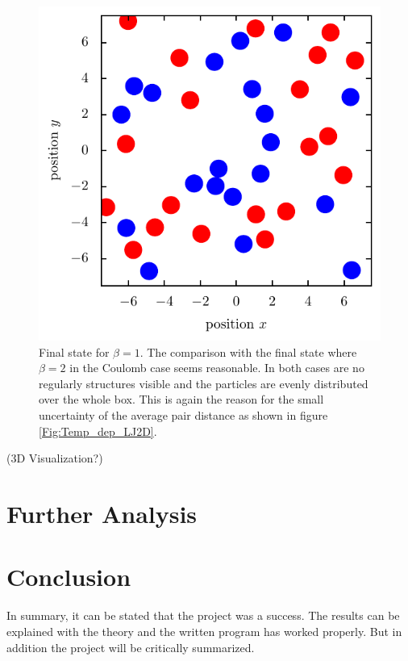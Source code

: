 \documentclass[11pt, a4paper]{article}
\numberwithin{equation}{section}
\newcommand{\remark}[1]{{\color{red}(#1)}}
\begin{document}
\begin{figure}[!h]
\centering
\includegraphics[scale=1]{figures/Beta_1_LJ.pdf}
\caption{Final state for $\beta = 1$.
The comparison with the final state where $\beta = 2$ in the Coulomb case seems reasonable.
In both cases are no regularly structures visible and the particles are evenly distributed over the whole box.
This is again the reason for the small uncertainty of the average pair distance as shown in figure \ref{Fig:Temp_dep_LJ2D}.}
\end{figure}
\remark{3D Visualization?}
\section{Further Analysis} \label{sec:Further_Analysis}


\section{Conclusion}

In summary, it can be stated that the project was a success.
The results can be explained with the theory and the written program has worked properly.
But in addition the project will be critically summarized.
\end{document}
